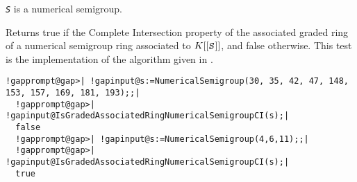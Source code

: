 \documentclass[a4paper,11pt]{report}
\begin{document}
{{{ \mbox{\texttt{\mdseries\slshape S}} is a numerical semigroup. 

 Returns true if the Complete Intersection property of the associated graded
ring of a numerical semigroup ring associated to $K[[\mbox{\texttt{\mdseries\slshape S}}]]$, and false otherwise. This test is the implementation of the algorithm given
in \cite{DAMSwhen}. 
\begin{Verbatim}[commandchars=!@|,fontsize=\small,frame=single,label=Example]
  !gapprompt@gap>| !gapinput@s:=NumericalSemigroup(30, 35, 42, 47, 148, 153, 157, 169, 181, 193);;|
  !gapprompt@gap>| !gapinput@IsGradedAssociatedRingNumericalSemigroupCI(s);|
  false
  !gapprompt@gap>| !gapinput@s:=NumericalSemigroup(4,6,11);;|
  !gapprompt@gap>| !gapinput@IsGradedAssociatedRingNumericalSemigroupCI(s);|
  true
\end{Verbatim}
 }

 }

 }

 
\end{document}
